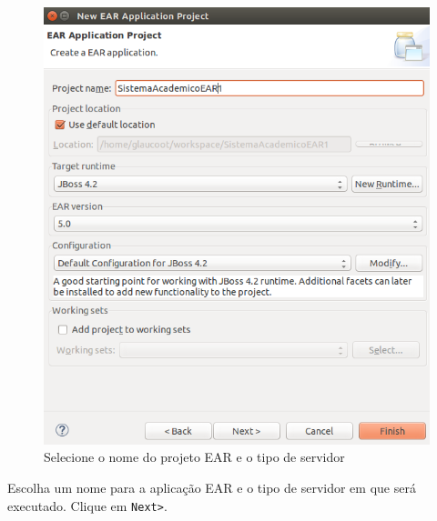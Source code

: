 \begin{figure}[H]
	\centering
	\includegraphics[scale=0.5]{files/imgs/gwt-05.png}
	\caption{Selecione o nome do projeto EAR e o tipo de servidor}
	\label{gwt05}
\end{figure}

Escolha um nome para a aplicação EAR e o tipo de servidor em que será executado. Clique em \texttt{Next>}.

